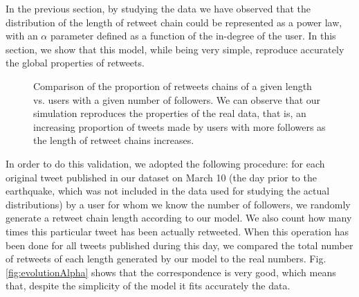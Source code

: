 \documentclass[conference]{IEEEtran}
\begin{document}
In the previous section, by studying the data we have observed that the distribution of the length of retweet chain could be represented as a power law, with an $\alpha$ parameter defined as a function of the in-degree of the user. In this section, we show that this model, while being very simple, reproduce accurately the global properties of retweets.


\begin{figure}[t]
\centerline{
{}}
\caption{Comparison of the proportion of retweets chains of a given length vs. users with a given number of followers. We can observe that our simulation reproduces the properties of the real data, that is, an increasing proportion of tweets made by users with more followers as the length of retweet chains increases.}
\label{fig_sim}
\end{figure}


In order to do this validation, we adopted the following procedure: for each original tweet published in our dataset on March 10 (the day prior to the earthquake, which was not included in the data used for studying the actual distributions) by a user for whom we know the number of followers, we randomly generate a retweet chain length according to our model. We also count how many times this particular tweet has been actually retweeted. When this operation has been done for all tweets published during this day, we compared the total number of retweets of each length generated by our model to the real numbers. Fig. \ref{fig:evolutionAlpha} shows that the correspondence is very good, which means that, despite the simplicity of the model it fits accurately the data.
\end{document}
